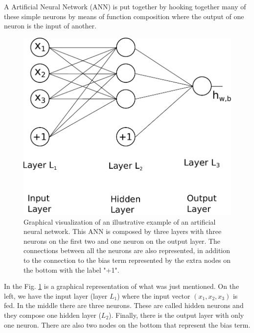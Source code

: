 \documentclass{article}
\begin{document}
A Artificial Neural Network (ANN) is put together by hooking together many of these simple neurons by means of function composition where the output of one neuron is the input of another.


\begin{figure}[!h]
	\centering
	\includegraphics[width=\linewidth]{firstANN.pdf}
	\caption{Graphical visualization of an illustrative example of an artificial neural network. This ANN is composed by three layers with three neurons on the first two and one neuron on the output layer. The connections between all the neurons are also represented, in addition to the connection to the bias term represented by the extra nodes on the bottom with the label "+1".
}
\label{fig:first-ANN}
\end{figure}
In the Fig. \ref{fig:first-ANN} is a graphical representation of what was just mentioned. On the left, we have the input layer (layer $L_1$) where the input vector $(x_1,x_2,x_3)$ is fed. In the middle there are three neurons. These are called hidden neurons and they compose one hidden layer ($L_2$). Finally, there is the output layer with only one neuron. There are also two nodes on the bottom that represent the bias term.
\end{document}
